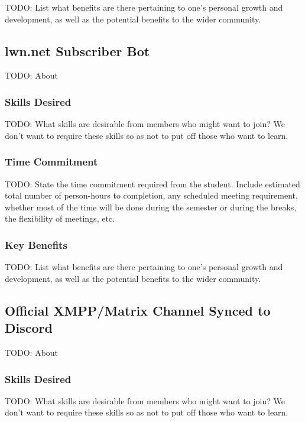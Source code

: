\documentclass[11pt,fleqn]{article}
\begin{document}
TODO: List what benefits are there pertaining to one's personal growth and development, as well as the potential benefits to the wider community.

\subsection{lwn.net Subscriber Bot}

TODO: About

\subsubsection*{Skills Desired}

TODO: What skills are desirable from members who might want to join?  We don't want to require these skills so as not to put off those who want to learn.

\subsubsection*{Time Commitment}

TODO: State the time commitment required from the student.  Include estimated total number of person-hours to completion, any scheduled meeting requirement, whether most of the time will be done during the semester or during the breaks, the flexibility of meetings, etc.

\subsubsection*{Key Benefits}

TODO: List what benefits are there pertaining to one's personal growth and development, as well as the potential benefits to the wider community.

\subsection{Official XMPP/Matrix Channel Synced to Discord}

TODO: About

\subsubsection*{Skills Desired}

TODO: What skills are desirable from members who might want to join?  We don't want to require these skills so as not to put off those who want to learn.
\end{document}
